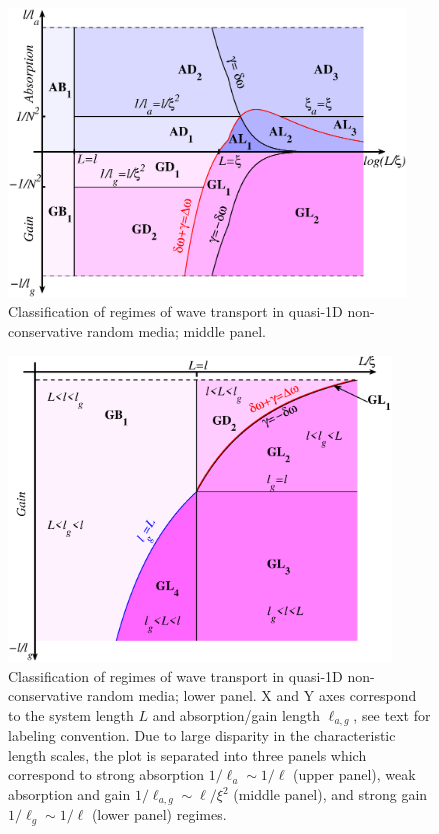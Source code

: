 \begin{figure}
\hskip -0.1cm
\centerline{\includegraphics[width=4.15in]{chapters/Classification_of_regimes_of_wave_transport_in_non-conservative_random_media__J_Mod_Optics/pictures/fig1b_regimes_plot_main}}
\caption[Classification of regimes of wave transport in quasi-1D non-conservative random media; middle panel.]{Classification of regimes of wave transport in quasi-1D non-conservative random media; middle panel.}
\end{figure}

\begin{figure}
\vskip -0.6cm
\centerline{\includegraphics[width=4in]{chapters/Classification_of_regimes_of_wave_transport_in_non-conservative_random_media__J_Mod_Optics/pictures/fig1c_regimes_plot_lower}}
\vskip -0.2cm
\caption[Classification of regimes of wave transport in quasi-1D non-conservative random media; lower panel.]{\label{fig:phase_space} Classification of regimes of wave transport in quasi-1D non-conservative random media; lower panel. X and Y axes correspond to the system length $L$ and absorption/gain length $\ell_{a,g}$, see text for labeling convention. Due to large disparity in the characteristic length scales, the plot is separated into three panels which correspond to strong absorption $1/\ell_a\sim 1/\ell$ (upper panel), weak absorption and gain $1/\ell_{a,g}\sim \ell/\xi^2$ (middle panel), and strong gain $1/\ell_g\sim 1/\ell$ (lower panel) regimes. }
\end{figure}

